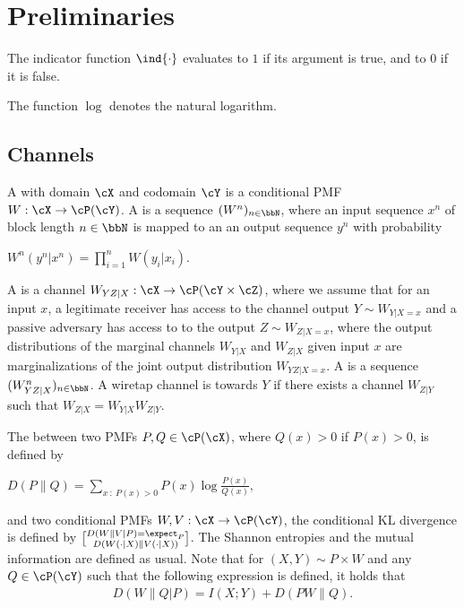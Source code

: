 \documentclass[conference,final]{IEEEtran}
\begin{document}
\section{Preliminaries}
\label{sec:prelim}
















The indicator function $\ind{\cdot}$ evaluates to $1$
if its argument is true, and to $0$ if it is false.




The function $\log$ denotes the natural logarithm.

\subsection{Channels}

A  with domain $\cX$ and codomain $\cY$
is a conditional PMF $W : \cX \to \cP(\cY)$.
A  is a sequence
$(W^n)_{n \in \bbN}$, where an input sequence $x^n$
of block length $n \in \bbN$
is mapped to an an output sequence $y^n$
with probability

$
  W^n(y^n|x^n) = \prod_{i=1}^n W(y_i | x_i).
$

A  is a channel $W_{YZ|X} : \cX \to \cP(\cY \times \cZ)$,
where we assume that for an input $x$,
a legitimate receiver has access to the channel output $Y \sim W_{Y|X=x}$
and a passive adversary has access to to the output $Z \sim W_{Z|X=x}$,
where the output distributions of the marginal channels $W_{Y|X}$ and $W_{Z|X}$
given input $x$ are marginalizations of the joint output distribution $W_{YZ|X=x}$.
A  is
a sequence $(W_{YZ|X}^n)_{n \in \bbN}$.
A wiretap channel is  towards $Y$
if there exists a channel $W_{Z|Y}$ such that $W_{Z|X} = W_{Y|X} W_{Z|Y}$.

The  between two PMFs
$P,Q \in \cP(\cX)$, where $Q(x) > 0$ if $P(x) > 0$, is defined by

$
  D(P \| Q) = \sum_{x \::\: P(x) > 0} P(x) \log \frac{P(x)}{Q(x)},
$

and two conditional PMFs $W, V : \cX \to \cP(\cY)$,
the conditional KL divergence is defined by
$D(W \| V | P) = \expect_P \brack{ D(W(\cdot|X) \| V(\cdot|X)) }$.
The Shannon entropies and the mutual information are defined as usual.
Note that for $(X,Y) \sim P \times W$ and any $Q \in \cP(\cY)$
such that the following expression is defined, it holds that
\begin{gather}
  D(W \| Q | P) = I(X; Y) + D(PW \| Q).
\end{gather}
\end{document}
